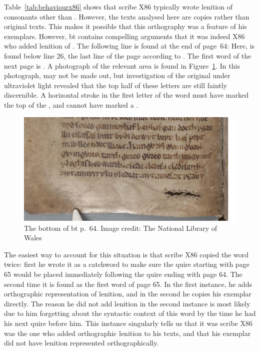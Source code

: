 Table~\ref{tab:behaviourx86} shows that scribe X86 typically wrote lenition of consonants other than . However, the texts analysed here are copies rather than original texts. This makes it possible that this orthography was a feature of his exemplars. However, \acrshort{bt} contains compelling arguments that it was indeed X86 who added lenition of . The following line is found at the end of page~64:
Here,  is found below line 26, the last line of the page according to \textcite{evans_facsimile_1915}. The first word of the next page is . A photograph of the relevant area is found in Figure~\ref{fig:p64}. In this photograph,  may not be made out, but investigation of the original under ultraviolet light revealed that the top half of these letters are still faintly discernible. A horizontal stroke in the first letter of the word must have marked the top of the , and cannot have marked a .  

\begin{figure}[h]
    \centering
    \includegraphics[width=\textwidth]{3orth/images/canvas.png}
    \caption[The bottom of \gls{bt} p.~64]{The bottom of \gls{bt} p.~64. Image credit: The National Library of Wales}
    \label{fig:p64}
\end{figure}

The easiest way to account for this situation is that scribe X86  copied the word  twice: first he wrote it as a catchword to make sure the quire starting with page 65 would be placed immediately following the quire ending with page 64. The second time it is found as the first word of page 65. In the first instance, he adds orthographic representation of lenition, and in the second he copies his exemplar directly. The reason he did not add lenition in the second instance is most likely due to him forgetting about the syntactic context of this word by the time he had his next quire before him. This instance singularly tells us that it was scribe X86 was the one who added orthographic lenition to his texts, and that his exemplar did not have lenition represented orthographically.


